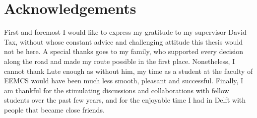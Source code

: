 \chapter*{Acknowledgements}
\label{chap:acknowledgements}

\bigskip

First and foremost I would like to express my gratitude to my supervisor David Tax, without whose constant advice and challenging attitude this thesis would not be here. A special thanks goes to my family, who supported every decision along the road and made my route possible in the first place. Nonetheless, I cannot thank Lute enough as without him, my time as a student at the faculty of EEMCS would have been much less smooth, pleasant and successful. Finally, I am thankful for the stimulating discussions and collaborations with fellow students over the past few years, and for the enjoyable time I had in Delft with people that became close friends.